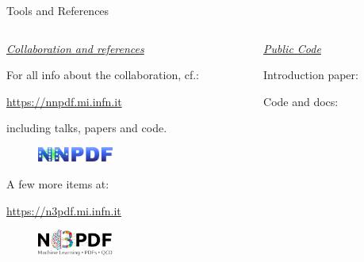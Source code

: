 \documentclass[9pt]{beamer}
\begin{document}
\begin{frame}{Tools and References}
    \begin{columns}
        \begin{column}{0.5\textwidth}
            \uline{{\LARGE\itshape Collaboration and references}}
            \vspace*{15pt}

            For all info about the collaboration, cf.:

            \begin{center}\url{https://nnpdf.mi.infn.it}\end{center}

            including talks, papers and code.

            \vspace*{5pt}
            \begin{figure}
                \centering
                \includegraphics[width=2.5cm]{../_logos/nnpdf_logo.pdf}
            \end{figure}
            \vspace*{10pt}

            A few more items at:

            \begin{center}\url{https://n3pdf.mi.infn.it}\end{center}

            \vspace*{5pt}
            \begin{figure}
                \centering
                \includegraphics[width=2.5cm]{../_logos/n3pdf_logo.pdf}
            \end{figure}
        \end{column}
        \begin{column}{0.5\textwidth}
            \uline{{\LARGE\itshape Public Code}}
            \vspace*{15pt}

            Introduction paper:\hspace*{10pt}
            \vspace*{10pt}

            Code and docs:
            \vspace*{5pt}


\end{column}
\end{columns}
\end{frame}
\end{document}
